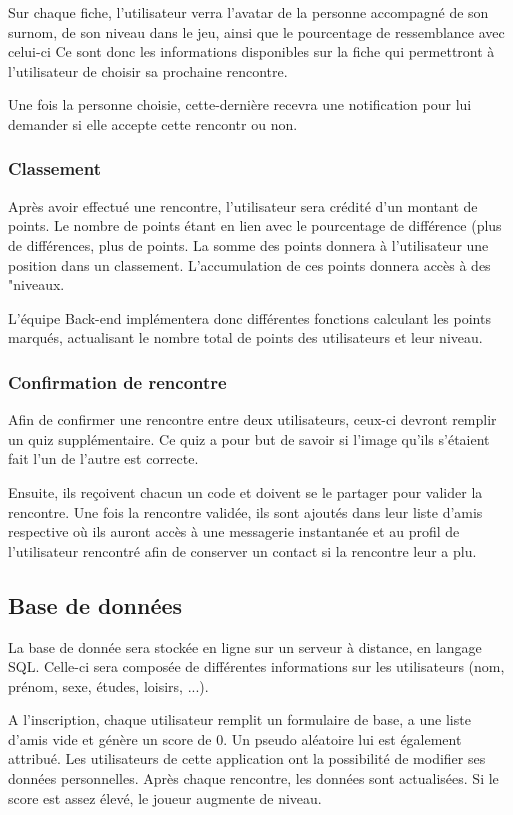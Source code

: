 \documentclass[10pt]{article}
\begin{document}
    Sur chaque fiche, l'utilisateur verra l'avatar de la personne accompagné de son surnom, de son niveau dans le jeu, ainsi que le 
    pourcentage de ressemblance avec celui-ci  
    Ce sont donc les informations disponibles sur la fiche qui permettront à l'utilisateur de choisir sa prochaine rencontre.

    Une fois la personne choisie, cette-dernière recevra une notification pour lui demander si elle accepte cette rencontr ou non.
   \subsubsection{Classement}
    Après avoir effectué une rencontre, l'utilisateur sera crédité d'un montant de points. Le nombre de points étant en lien avec le
    pourcentage de différence (plus de différences, plus de points. La somme des points donnera à l'utilisateur une position dans 
    un classement. L'accumulation de ces points donnera accès à des "niveaux.

    L'équipe Back-end implémentera donc différentes fonctions calculant les points marqués, actualisant le nombre total de points des
    utilisateurs et leur niveau.
   \subsubsection{Confirmation de rencontre}
    Afin de confirmer une rencontre entre deux utilisateurs, ceux-ci devront remplir un quiz supplémentaire. 
    Ce quiz a pour but de savoir si l'image qu'ils s'étaient fait l'un de l'autre est correcte. 

    Ensuite, ils reçoivent chacun un code et doivent se le partager pour valider la rencontre. 
    Une fois la rencontre validée, ils sont ajoutés dans leur liste d'amis respective où ils auront accès à une messagerie 
    instantanée et au profil de l'utilisateur rencontré afin de conserver un contact si la rencontre leur a plu. 
    
  \subsection{Base de données}
   La base de donnée sera stockée en ligne sur un serveur à distance, en langage SQL. 
   Celle-ci sera composée de différentes informations sur les utilisateurs (nom, prénom, sexe, études, loisirs, ...).
   
   A l'inscription, chaque utilisateur remplit un formulaire de base, a une liste d'amis vide et génère un score de 0.
   Un pseudo aléatoire lui est également attribué. Les utilisateurs de cette application ont la possibilité de modifier ses données personnelles.
   Après chaque rencontre, les données sont actualisées. Si le score est assez élevé, le joueur augmente de niveau.
\end{document}
